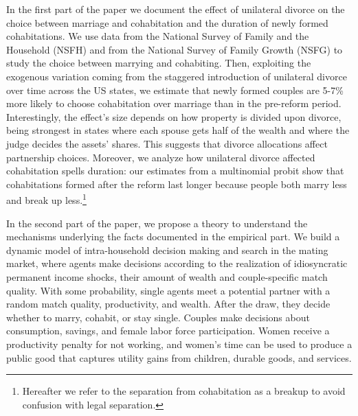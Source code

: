 \documentclass[12pt]{article}
\numberwithin{table}{section}
\begin{document}

In the first part of the paper we document the effect of unilateral divorce on the choice between marriage and cohabitation and the duration of newly formed cohabitations. We use data from the National Survey of Family and the Household (NSFH) and from the National Survey of Family Growth (NSFG) to study the choice between marrying and cohabiting. Then, exploiting the exogenous variation coming from the staggered introduction of unilateral divorce over time across the US states, we estimate that newly formed couples are 5-7\% more likely to choose cohabitation over marriage than in the pre-reform period. %
Interestingly, the effect's size depends on how property is divided upon divorce, being strongest in states where each spouse gets half of the wealth and where the judge decides the assets' shares. This suggests that divorce allocations affect partnership choices.
Moreover, we analyze how unilateral divorce affected cohabitation spells duration: our estimates from a multinomial probit show that cohabitations formed after the reform last longer because people both marry less and break up less.\footnote{Hereafter we refer to the separation from cohabitation as a breakup to avoid confusion with legal separation.}

In the second part of the paper, we propose a theory to understand the mechanisms underlying the facts documented in the empirical part. We build a dynamic model of intra-household decision making and search in the mating market, where agents make decisions according to the realization of idiosyncratic permanent income shocks, their amount of wealth and couple-specific match quality. With some probability, single agents meet a potential partner with a random match quality, productivity, and wealth. After the draw, they decide whether to marry, cohabit, or stay single. Couples make decisions about consumption, savings, and female labor force participation. Women receive a productivity penalty for not working, and women's time can be used to produce a public good that captures utility gains from children, durable goods, and services.
\end{document}
